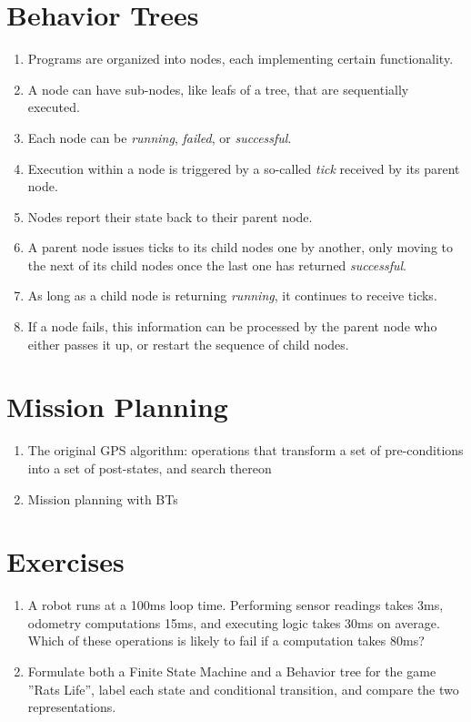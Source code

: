 \section{Behavior Trees}
\begin{enumerate}
\item Programs are organized into nodes, each implementing certain functionality.
\item A node can have sub-nodes, like leafs of a tree, that are sequentially executed.
\item Each node can be \emph{running}, \emph{failed}, or \emph{successful}.
\item Execution within a node is triggered by a so-called \emph{tick} received by its parent node.
\item Nodes report their state back to their parent node.
\item A parent node issues ticks to its child nodes one by another, only moving to the next of its child nodes once the last one has returned \emph{successful}.
\item As long as a child node is returning \emph{running}, it continues to receive ticks.
\item If a node fails, this information can be processed by the parent node who either passes it up, or restart the sequence of child nodes.
\end{enumerate}

\section{Mission Planning}
\begin{enumerate}
\item The original GPS algorithm: operations that transform a set of pre-conditions into a set of post-states, and search thereon
\item Mission planning with BTs
\end{enumerate}

\section{Exercises}

\begin{enumerate}
\item A robot runs at a 100ms loop time. Performing sensor readings takes 3ms, odometry computations 15ms, and executing logic takes 30ms on average. Which of these operations is likely to fail if a computation takes 80ms?
\item Formulate both a Finite State Machine and a Behavior tree for the game ''Rats Life'', label each state and conditional transition, and compare the two representations.
\end{enumerate}